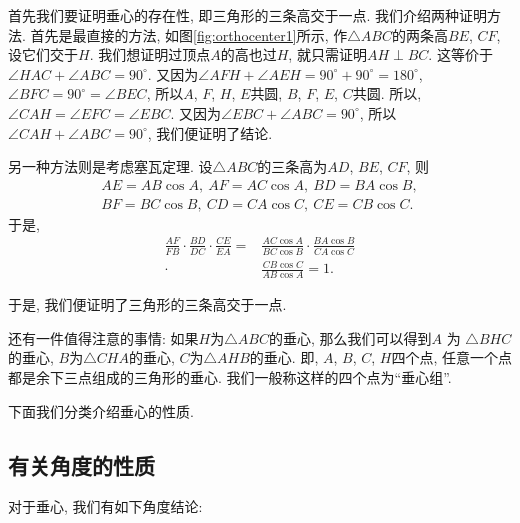 \documentclass{book}
\begin{document}
\begin{paracol}{2}
\switchcolumn
首先我们要证明垂心的存在性, 即三角形的三条高交于一点. 我们介绍两种证明方法. 首先是最直接的方法, 如图\ref{fig:orthocenter1}所示, 作$\triangle ABC$的两条高$BE$, $CF$, 设它们交于$H$. 我们想证明过顶点$A$的高也过$H$, 就只需证明$AH\perp BC$. 这等价于$\angle HAC+\angle ABC=90^\circ$. 又因为$\angle AFH+\angle AEH=90^\circ+90^\circ=180^\circ$, $\angle BFC=90^\circ=\angle BEC$, 所以$A$, $F$, $H$, $E$共圆, $B$, $F$, $E$, $C$共圆. 所以, $\angle CAH=\angle EFC=\angle EBC$. 又因为$\angle EBC+\angle ABC=90^\circ$, 所以$\angle CAH+\angle ABC=90^\circ$, 我们便证明了结论.\par
另一种方法则是考虑塞瓦定理. 设$\triangle ABC$的三条高为$AD$, $BE$, $CF$, 则
\begin{align*}
AE=AB\cos{A},\ AF=AC\cos{A},\ BD=BA\cos{B},\\
BF=BC\cos{B},\ CD=CA\cos{C},\ CE=CB\cos{C}.
\end{align*}
于是, 
\begin{align*}
\frac{AF}{FB}\cdot\frac{BD}{DC}\cdot\frac{CE}{EA}=&\frac{AC\cos{A}}{BC\cos{B}}\cdot\frac{BA\cos{B}}{CA\cos{C}}\\
\cdot&\frac{CB\cos{C}}{AB\cos{A}}=1.
\end{align*}\par
于是, 我们便证明了三角形的三条高交于一点.\par
还有一件值得注意的事情: 如果$ H $为$ \triangle ABC $的垂心, 那么我们可以得到$ A $ 为 $ \triangle BHC $的垂心, $ B $为$ \triangle CHA $的垂心, $ C $为$ \triangle AHB $的垂心. 即, $ A $, $ B $, $ C $, $ H $四个点, 任意一个点都是余下三点组成的三角形的垂心. 我们一般称这样的四个点为“垂心组”.\par
下面我们分类介绍垂心的性质.

\subsection{有关角度的性质}\label{subsec:angle}
对于垂心, 我们有如下角度结论:


\end{paracol}
\end{document}
